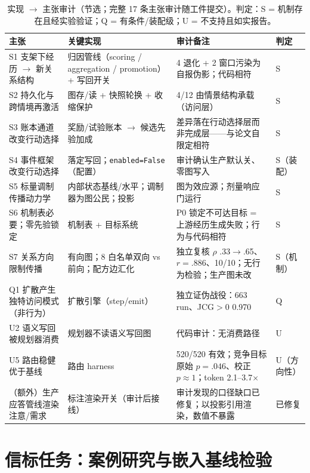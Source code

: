 \documentclass[10pt,a4paper]{ctexart}
\begin{document}
\begin{table}[h]
\centering\small
\caption{实现 $\rightarrow$ 主张审计（节选；完整 17 条主张审计随工件提交）。判定：S = 机制存在且经实验验证；Q = 有条件/装配级；U = 不支持且如实报告。}
\label{tab:s-audit}
\begin{tabular}{L{4.6cm}L{3.2cm}L{3.6cm}L{1.7cm}}
\toprule
\textbf{主张} & \textbf{关键实现} & \textbf{审计备注} & \textbf{判定} \\
\midrule
S1 支架下经历 $\rightarrow$ 新关系结构 & 归因管线（scoring / aggregation / promotion）+ 写回开关 & 4 退化 + 2 窗口污染为自报伪影；代码相符 & S \\
S2 持久化与跨情境再激活 & 图存/读 + 快照轮换 + 收缩保护 & 4/12 由情景结构承载（访问层） & S \\
S3 账本通道改变行动选择 & 奖励/试验账本 $\rightarrow$ 候选先验加成 & 差异落在行动选择层而非完成层——与论文自限定相符 & S \\
S4 事件框架改变行动选择 & 落定写回；\texttt{enabled=False}（配置） & 审计确认生产默认关、零图写入 & S（装配） \\
S5 标量调制传播动力学 & 内部状态基线/水平；调制器为图公民；投影 & 图为效应源；剂量响应门运行 & S \\
S6 机制表必要；零先验锁定 & 机制表 + 目标系统 & P0 锁定不可达目标 = 上游经历生成失败；行为与代码相符 & S \\
S7 关系方向限制传播 & 有向图；8 白名单双向 vs 前向；配方边汇化 & 独立复核 $\rho$ .33$\rightarrow$.65、$r{=}.886$、10/10；无行为检验；生产图未改 & S（机制） \\
Q1 扩散产生独特访问模式（非行为） & 扩散引擎（step/emit） & 独立证伪战役：663 run、JCG$>0$ 0.970 & Q \\
U2 语义写回被规划器消费 & 规划器不读语义写回图 & 代码审计：无消费路径 & U \\
U5 路由稳健优于基线 & 路由 harness & 520/520 有效；竞争目标原始 $p{=}.046$、校正 $p{\approx}1$；token 2.1--3.7$\times$ & U（方向性） \\
（额外）生产应答管线渲染注意/需求 & 标注渲染开关（审计后接线） & 审计发现的口径缺口已修复；以投影引用渲染，数值不暴露 & 已修复 \\
\bottomrule
\end{tabular}
\end{table}

\section{信标任务：案例研究与嵌入基线检验}
\label{s6:beacon}
\end{document}
